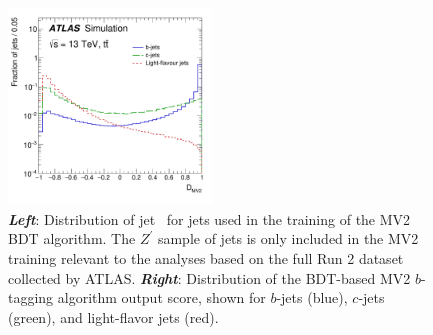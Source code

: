 \begin{figure}[!htb]
    \begin{center}
        \includegraphics[width=0.48\textwidth]{figures/chapter3/ftag/ftag_mv2c10_disc}
        \caption{
            \textbf{\textit{Left}}: Distribution of jet \pT~for jets used in the training of the MV2 BDT algorithm.
                The $Z^{\prime}$ sample of jets is only included in the MV2 training relevant to the analyses
                based on the full Run 2 dataset collected by ATLAS.
            \textbf{\textit{Right}}: Distribution of the BDT-based MV2 $b$-tagging algorithm output score, shown for
                $b$-jets (blue), $c$-jets (green), and light-flavor jets (red).
        }
        \label{fig:ftag_mv2c10_disc}
    \end{center}
\end{figure}



